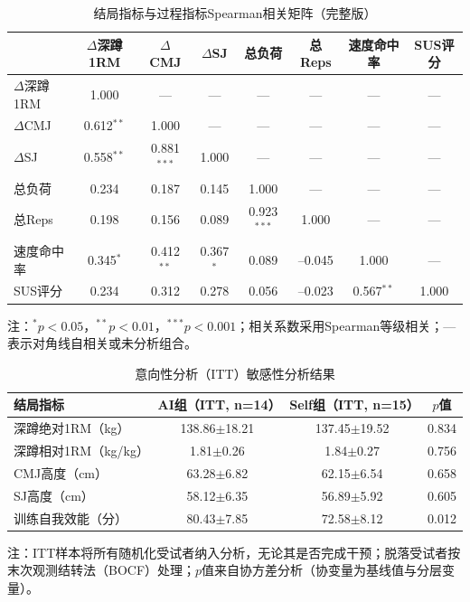 \begin{table}[htbp]
\centering
\caption{结局指标与过程指标Spearman相关矩阵（完整版）}
\label{tab:app_correlation_full}
\begin{threeparttable}
\scriptsize
\begin{tabular}{lccccccc}
\toprule
 & $\Delta$深蹲1RM & $\Delta$CMJ & $\Delta$SJ & 总负荷 & 总Reps & 速度命中率 & SUS评分 \\
\midrule
$\Delta$深蹲1RM & 1.000 & --- & --- & --- & --- & --- & --- \\
$\Delta$CMJ & 0.612$^{**}$ & 1.000 & --- & --- & --- & --- & --- \\
$\Delta$SJ & 0.558$^{**}$ & 0.881$^{***}$ & 1.000 & --- & --- & --- & --- \\
总负荷 & 0.234 & 0.187 & 0.145 & 1.000 & --- & --- & --- \\
总Reps & 0.198 & 0.156 & 0.089 & 0.923$^{***}$ & 1.000 & --- & --- \\
速度命中率 & 0.345$^{*}$ & 0.412$^{**}$ & 0.367$^{*}$ & 0.089 & --0.045 & 1.000 & --- \\
SUS评分 & 0.234 & 0.312 & 0.278 & 0.056 & --0.023 & 0.567$^{**}$ & 1.000 \\
\bottomrule
\end{tabular}
\begin{tablenotes}[flushleft]\footnotesize
\item 注：$^{*}p<0.05$，$^{**}p<0.01$，$^{***}p<0.001$；相关系数采用Spearman等级相关；---表示对角线自相关或未分析组合。
\end{tablenotes}
\end{threeparttable}
\end{table}

\begin{table}[htbp]
\centering
\caption{意向性分析（ITT）敏感性分析结果}
\label{tab:app_itt_sensitivity}
\begin{threeparttable}
\scriptsize
\begin{tabular}{lccc}
\toprule
结局指标 & AI组（ITT, n=14） & Self组（ITT, n=15） & $p$值 \\
\midrule
深蹲绝对1RM（kg） & 138.86$\pm$18.21 & 137.45$\pm$19.52 & 0.834 \\
深蹲相对1RM（kg/kg） & 1.81$\pm$0.26 & 1.84$\pm$0.27 & 0.756 \\
CMJ高度（cm） & 63.28$\pm$6.82 & 62.15$\pm$6.54 & 0.658 \\
SJ高度（cm） & 58.12$\pm$6.35 & 56.89$\pm$5.92 & 0.605 \\
训练自我效能（分） & 80.43$\pm$7.85 & 72.58$\pm$8.12 & 0.012 \\
\bottomrule
\end{tabular}
\begin{tablenotes}[flushleft]\footnotesize
\item 注：ITT样本将所有随机化受试者纳入分析，无论其是否完成干预；脱落受试者按末次观测结转法（BOCF）处理；$p$值来自协方差分析（协变量为基线值与分层变量）。
\end{tablenotes}
\end{threeparttable}
\end{table}
